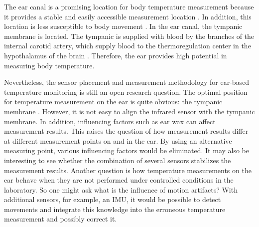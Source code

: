 The ear canal is a promising location for body temperature measurement because it provides a stable and easily accessible measurement location \cite{ericksonComparisonEarbasedBladder1993}.
In addition, this location is less susceptible to body movement \cite{grossmanFrequencyVelocityRotational1988, kavanaghRoleNeckTrunk2006a}.
In the ear canal, the tympanic membrane is located.
The tympanic is supplied with blood by the branches of the internal carotid artery, which supply blood to the thermoregulation center in the hypothalamus of the brain \cite{moranCoreTemperatureMeasurement2002a}.
Therefore, the ear provides high potential in measuring body temperature.

Nevertheless, the sensor placement and measurement methodology for ear-based temperature monitoring is still an open research question. 
The optimal position for temperature measurement on the ear is quite obvious: the tympanic membrane \cite{childsTympanicMembraneTemperature1999, kimComparisonBilateralEardrum2022, mumaComparisonRectalAxillary1991}.
However, it is not easy to align the infrared sensor with the tympanic membrane.
In addition, influencing factors such as ear wax can affect measurement results. 
This raises the question of how measurement results differ at different measurement points on and in the ear. 
By using an alternative measuring point, various influencing factors would be eliminated.
It may also be interesting to see whether the combination of several sensors stabilizes the measurement results.
Another question is how temperature measurements on the ear behave when they are not performed under controlled conditions in the laboratory.
So one might ask what is the influence of motion artifacts?
With additional sensors, for example, an IMU, it would be possible to detect movements and integrate this knowledge into the erroneous temperature measurement and possibly correct it.

